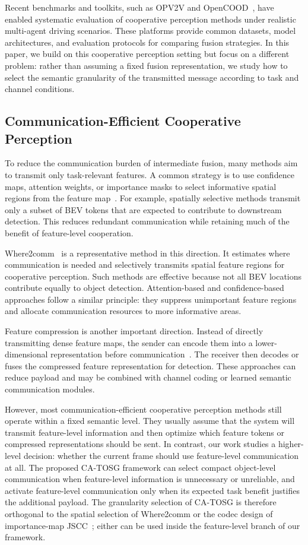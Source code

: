 \documentclass[journal]{IEEEtran}
\newcommand{\method}{CA-TOSG}
\begin{document}
Recent benchmarks and toolkits, such as OPV2V and OpenCOOD~\cite{xu2022opv2v}, have enabled systematic evaluation of cooperative perception methods under realistic multi-agent driving scenarios. These platforms provide common datasets, model architectures, and evaluation protocols for comparing fusion strategies. In this paper, we build on this cooperative perception setting but focus on a different problem: rather than assuming a fixed fusion representation, we study how to select the semantic granularity of the transmitted message according to task and channel conditions.

\subsection{Communication-Efficient Cooperative Perception}

To reduce the communication burden of intermediate fusion, many methods aim to transmit only task-relevant features. A common strategy is to use confidence maps, attention weights, or importance masks to select informative spatial regions from the feature map~\cite{hu2022where2comm,sheng2024importance}. For example, spatially selective methods transmit only a subset of BEV tokens that are expected to contribute to downstream detection. This reduces redundant communication while retaining much of the benefit of feature-level cooperation.

Where2comm~\cite{hu2022where2comm} is a representative method in this direction. It estimates where communication is needed and selectively transmits spatial feature regions for cooperative perception. Such methods are effective because not all BEV locations contribute equally to object detection. Attention-based and confidence-based approaches follow a similar principle: they suppress unimportant feature regions and allocate communication resources to more informative areas.

Feature compression is another important direction. Instead of directly transmitting dense feature maps, the sender can encode them into a lower-dimensional representation before communication~\cite{sheng2024importance}. The receiver then decodes or fuses the compressed feature representation for detection. These approaches can reduce payload and may be combined with channel coding or learned semantic communication modules.

However, most communication-efficient cooperative perception methods still operate within a fixed semantic level. They usually assume that the system will transmit feature-level information and then optimize which feature tokens or compressed representations should be sent. In contrast, our work studies a higher-level decision: whether the current frame should use feature-level communication at all. The proposed \method{} framework can select compact object-level communication when feature-level information is unnecessary or unreliable, and activate feature-level communication only when its expected task benefit justifies the additional payload. The granularity selection of \method{} is therefore orthogonal to the spatial selection of Where2comm or the codec design of importance-map JSCC~\cite{sheng2024importance}; either can be used inside the feature-level branch of our framework.
\end{document}
